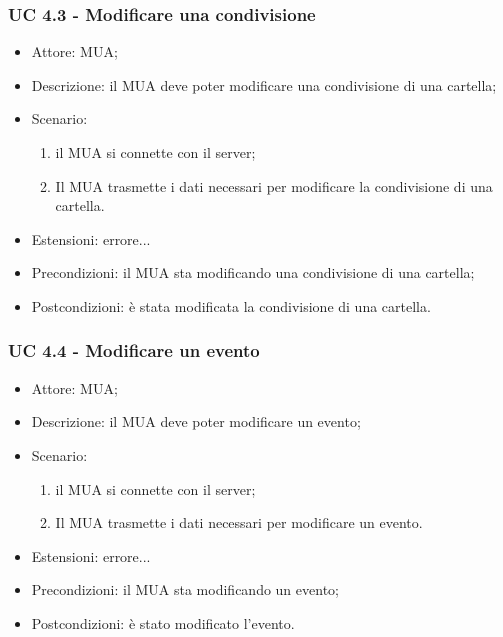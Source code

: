     \subsubsection{UC 4.3 - Modificare una condivisione} \label{sec: UC 4.3}
    \begin{itemize}
        \item Attore: MUA;
        \item Descrizione: il MUA deve poter modificare una condivisione di una cartella;
        \item Scenario:
        \begin{enumerate}
        \item il MUA si connette con il server;
        \item Il MUA trasmette i dati necessari per modificare la condivisione di una cartella.
        \end{enumerate}
        \item Estensioni: errore...
        \item Precondizioni: il MUA sta modificando una condivisione di una cartella;
        \item Postcondizioni: è stata modificata la condivisione di una cartella.
    \end{itemize}

    \subsubsection{UC 4.4 - Modificare un evento} \label{sec: UC 4.4}
    \begin{itemize}
        \item Attore: MUA;
        \item Descrizione: il MUA deve poter modificare un evento;
        \item Scenario:
        \begin{enumerate}
        \item il MUA si connette con il server;
        \item Il MUA trasmette i dati necessari per modificare un evento.
        \end{enumerate}
        \item Estensioni: errore...
        \item Precondizioni: il MUA sta modificando un evento;
        \item Postcondizioni: è stato modificato l'evento.
    \end{itemize}

